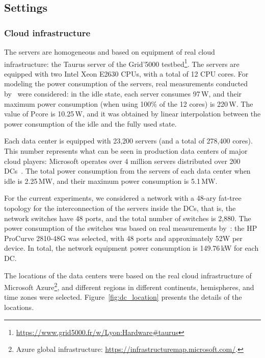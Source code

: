 \subsection{Settings}


\label{sec:settings_ccgrid}


\subsubsection{Cloud infrastructure}

The servers are homogeneous and based on equipment of real cloud infrastructure: the Taurus server of the Grid'5000 testbed\footnote{\url{https://www.grid5000.fr/w/Lyon:Hardware\#taurus}}. The servers are equipped with two Intel Xeon E2630 CPUs, with a total of 12 CPU cores. For modeling the power consumption of the servers, real measurements conducted by~\cite{ahvar22_estimating_cloud_cons} were considered: in the idle state, each server consumes 97\,W, and their maximum power consumption (when using 100\% of the 12 cores) is 220\,W. The value of Pcore is 10.25\,W, and it was obtained by linear interpolation between the power consumption of the idle and the fully used state.

Each data center is equipped with 23,200 servers (and a total of 278,400 cores). This number represents what can be seen in production data centers of major cloud players: Microsoft operates over 4 million servers distributed over 200 DCs~\cite{roach2021_microsoftazure}. The total power consumption from the servers of each data center when idle is 2.25\,MW, and their maximum power consumption is 5.1\,MW.

For the current experiments, we considered a network with a 48-ary fat-tree topology for the interconnection of the servers inside the DCs, that is, the network switches have 48 ports, and the total number of switches is 2,880. The power consumption of the switches was based on real measurements by~\citet{Hlavacs2009_energy_network_devices}: the HP ProCurve 2810-48G was selected, with 48 ports and approximately 52W per device. In total, the network equipment power consumption is 149.76\,kW for each DC.

The locations of the data centers were based on the real cloud infrastructure of Microsoft Azure\footnote{Azure global infrastructure: \url{https://infrastructuremap.microsoft.com/}.}, and different regions in different continents, hemispheres, and time zones were selected. Figure~\ref{fig:dc_location} presents the details of the locations.


